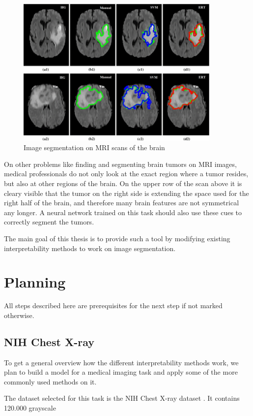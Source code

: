 \begin{figure}[H]
\centering
\caption{Image segmentation on MRI scans of the brain\cite{soltaninejad2017automated}}
\includegraphics[width=10cm]{images/brain_segmentation.jpg}
\end{figure}

On other problems like finding and segmenting brain tumors on MRI images, medical professionals do not only look at the exact region where a tumor resides, but also at other regions of the brain. On the upper row of the scan above it is cleary visible that the tumor on the right side is extending the space used for the right half of the brain, and therefore many brain features are not symmetrical any longer. A neural network trained on this task should also use these cues to correctly segment the tumors. 

The main goal of this thesis is to provide such a tool by modifying existing interpretability methods to work on image segmentation.

\section{Planning}
All steps described here are prerequisites for the next step if not marked otherwise.

\subsection{NIH Chest X-ray}
To get a general overview how the different interpretability methods work, we plan to build a model for a medical imaging task and apply some of the more commonly used methods on it.

The dataset selected for this task is the NIH Chest X-ray dataset \cite{todo}. It contains 120.000 grayscale 


